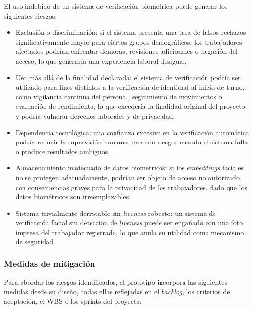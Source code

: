 \documentclass[
  11pt, %
]{charter}
\begin{document}
El uso indebido de un sistema de verificación biométrica puede generar los siguientes riesgos:

\begin{itemize}
  \item Exclusión o discriminación: si el sistema presenta una tasa de falsos rechazos significativamente mayor para ciertos grupos demográficos, los trabajadores afectados podrían enfrentar demoras, revisiones adicionales o negación del acceso, lo que generaría una experiencia laboral desigual.
  \item Uso más allá de la finalidad declarada: el sistema de verificación podría ser utilizado para fines distintos a la verificación de identidad al inicio de turno, como vigilancia continua del personal, seguimiento de movimientos o evaluación de rendimiento, lo que excedería la finalidad original del proyecto y podría vulnerar derechos laborales y de privacidad.
  \item Dependencia tecnológica: una confianza excesiva en la verificación automática podría reducir la supervisión humana, creando riesgos cuando el sistema falla o produce resultados ambiguos.
  \item Almacenamiento inadecuado de datos biométricos: si los \textit{embeddings} faciales no se protegen adecuadamente, podrían ser objeto de acceso no autorizado, con consecuencias graves para la privacidad de los trabajadores, dado que los datos biométricos son irreemplazables.
  \item Sistema trivialmente derrotable sin \textit{liveness} robusto: un sistema de verificación facial sin detección de \textit{liveness} puede ser engañado con una foto impresa del trabajador registrado, lo que anula su utilidad como mecanismo de seguridad.
\end{itemize}

\subsubsection{Medidas de mitigación}

Para abordar los riesgos identificados, el prototipo incorpora las siguientes medidas desde su diseño, todas ellas reflejadas en el \textit{backlog}, los criterios de aceptación, el WBS o los sprints del proyecto:
\end{document}
